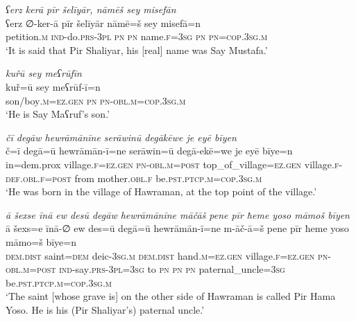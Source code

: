 \ea \label{ZP.1}
\textit{ʕerz kerā pīr šelīyār, nāmēš sey misefān} \\ 
\gll ʕerz ∅-ker-ā pīr šelīyār nāmē=š sey misefā=n \\ 
 petition\textsc{.m} \textsc{ind-}do\textsc{.prs}\textsc{-3pl} \textsc{pn} \textsc{pn} name\textsc{.f}\textsc{=3sg} \textsc{pn} \textsc{pn}\textsc{=cop}\textsc{.3sg}\textsc{.m} \\ 
\glt `It is said that Pir Shaliyar, his [real] name was Say Mustafa.'
\z 
 
\ea \label{ZP.2}
\textit{kuřū sey meʕrūfīn} \\ 
\gll kuř=ū sey meʕrūf-ī=n \\ 
 son/boy\textsc{.m}\textsc{\textsc{=ez.gen}} \textsc{pn} \textsc{pn}\textsc{-obl}\textsc{.m}\textsc{=cop}\textsc{.3sg}\textsc{.m} \\ 
\glt `He is Say Maʕruf’s son.'
\z 
 
\ea \label{ZP.3}
\textit{čī degāw hewrāmānīne serāwinū degākēwe je eyē bīyen} \\ 
\gll č=ī degā=ū hewrāmān-ī=ne serāwin=ū degā-ekē=we je eyē bīye=n \\ 
 in=dem.prox village\textsc{.f}\textsc{\textsc{=ez.gen}} \textsc{pn}\textsc{-obl}\textsc{.m}\textsc{=\textsc{post}} top\_of\_village\textsc{\textsc{=ez.gen}} village\textsc{.f}\textsc{-def}\textsc{.obl}\textsc{.f}\textsc{=\textsc{post}} from mother\textsc{.obl}\textsc{.f} be\textsc{.pst}\textsc{.ptcp}\textsc{.m}\textsc{=cop}\textsc{.3sg}\textsc{.m} \\ 
\glt `He was born in the village of Hawraman, at the top point of the village.'
\z 
 
\ea \label{ZP.6}
\textit{ā šexse īnā ew desū degāw hewrāmānīne māčāš pene pīr ħeme yoso māmoš bīyen} \\ 
\gll ā šexs=e īnā-∅ ew des=ū degā=ū hewrāmān-ī=ne m-āč-ā=š pene pīr ħeme yoso māmo=š bīye=n \\ 
 \textsc{dem.dist} saint\textsc{=dem} deic\textsc{-3sg}\textsc{.m} \textsc{dem.dist} hand\textsc{.m}\textsc{\textsc{=ez.gen}} village\textsc{.f}\textsc{\textsc{=ez.gen}} \textsc{pn}\textsc{-obl}\textsc{.m}\textsc{=\textsc{post}} \textsc{ind-}say\textsc{.prs}\textsc{-3pl}\textsc{=3sg} to \textsc{pn} \textsc{pn} \textsc{pn} paternal\_uncle\textsc{=3sg} be\textsc{.pst}\textsc{.ptcp}\textsc{.m}\textsc{=cop}\textsc{.3sg}\textsc{.m} \\ 
\glt `The saint [whose grave is] on the other side of Hawraman is called Pir Hama Yoso. He is his (Pir Shaliyar’s) paternal uncle.'
\z 
 
